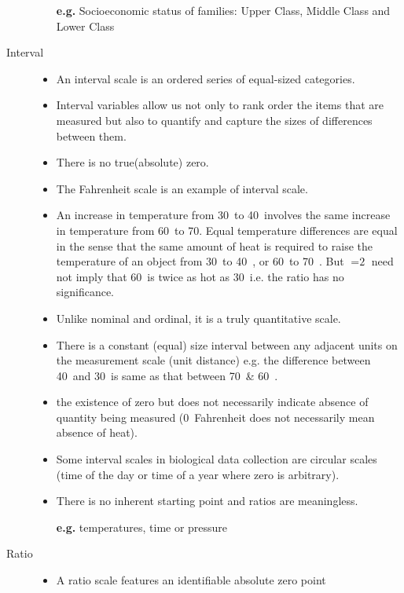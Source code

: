 \documentclass[
10pt, %
a4paper, %
]{report}
\begin{document}
\begin{description}
\begin{itemize}
\item[\textbf{e.g.}]  Socioeconomic status of families: Upper Class, Middle Class and Lower Class
\end{itemize}
\item[Interval]
\begin{itemize}
\item[]
\item An interval scale is an ordered series of equal-sized categories.
\item Interval variables allow us not only to rank order the items that are measured but also to quantify and capture the sizes of differences between them.
\item There is no true(absolute) zero.
\item The Fahrenheit scale is an example of interval scale.
\item An increase in temperature from 30\degree \ to 40\degree \  involves the same increase in temperature from 60\degree \ to 70\degree. Equal temperature differences are equal in the sense that the same amount of heat is required to raise the temperature of an object from 30\degree \ to 40\degree \ , or 60\degree \ to 70\degree \ . But  \(= \text{2}\) need not imply that 60\degree \  is twice as hot as 30\degree \  i.e. the ratio has no significance.
\item Unlike nominal and ordinal, it is a truly quantitative scale.
\item There is a constant (equal) size interval between any adjacent units on the measurement scale (unit distance) e.g. the difference between 40\degree \ 
and 30\degree \  is same as that between 70\degree \ \& 60\degree \ .
\item the existence of zero but does not necessarily indicate absence of quantity being measured (0\degree \  Fahrenheit does not necessarily mean absence of heat).
\item Some interval scales in biological data collection are circular scales (time of the day or time of a year where zero is arbitrary).
\item There is no inherent starting point and ratios are meaningless.
\item[\textbf{e.g.}] temperatures, time or pressure
\end{itemize}
\item[Ratio]
\begin{itemize}
\item[]
\item A ratio scale features an identifiable absolute zero point

\end{itemize}
\end{description}
\end{document}
